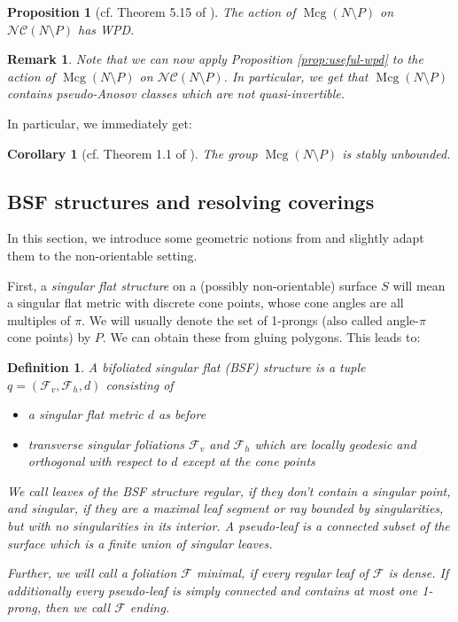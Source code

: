 \documentclass[a4paper]{article}
\newtheorem{remark}[theorem]{Remark}
\newtheorem{corollary}[theorem]{Corollary}
\newtheorem{definition}[theorem]{Definition}
\newtheorem{proposition}[theorem]{Proposition}
\newcommand{\ncg}{\mathcal{NC}}
\begin{document}
\begin{proposition}[cf. Theorem 5.15 of \cite{Bestvina-refinement}]\label{prop:wpd-downstairs}
    The action of $\operatorname{Mcg}(N\setminus P)$ on $\ncg(N\setminus P)$ has WPD.
\end{proposition}

\begin{remark}
Note that we can now apply Proposition \ref{prop:useful-wpd} to the action of $\operatorname{Mcg}(N\setminus P)$ on $\ncg(N\setminus P)$.
In particular, we get that $\operatorname{Mcg}(N\setminus P)$ contains pseudo-Anosov classes which are not quasi-invertible.    
\end{remark}

In particular, we immediately get:
\begin{corollary}[cf. Theorem 1.1 of \cite{Bestvina-refinement}]
    The group $\operatorname{Mcg}(N\setminus P)$ is stably unbounded.
\end{corollary}

\subsection{BSF structures and resolving coverings}\label{subsec:bsf}
In this section, we introduce some geometric notions from \cite{BHW2} and slightly adapt them to the non-orientable setting.

First, a \emph{singular flat structure} on a (possibly non-orientable) surface $S$ will mean a singular flat metric with discrete cone points, whose cone angles are all multiples of $\pi$.
We will usually denote the set of 1-prongs (also called angle-$\pi$ cone points) by $P$.
We can obtain these from gluing polygons.
This leads to:
\begin{definition}
    A \emph{bifoliated singular flat (BSF) structure} is a tuple $q = (\mathcal{F}_v, \mathcal{F}_h,d)$ consisting of\begin{itemize}
        \item a singular flat metric $d$ as before
        \item transverse singular foliations $\mathcal{F}_v$ and $\mathcal{F}_h$ which are locally geodesic and orthogonal with respect to $d$ except at the cone points
    \end{itemize}

We call leaves of the BSF structure \emph{regular}, if they don't contain a singular point, and \emph{singular}, if they are a maximal leaf segment or ray bounded by 
singularities, but with no singularities in its interior.
A \emph{pseudo-leaf} is a connected subset of the surface which is a finite union of singular leaves.

Further, we will call a foliation $\mathcal{F}$ \emph{minimal}, if every regular leaf of $\mathcal{F}$ is dense.
If additionally every pseudo-leaf is simply connected and contains at most one 1-prong, then we call $\mathcal{F}$ \emph{ending}.
\end{definition}
\end{document}

